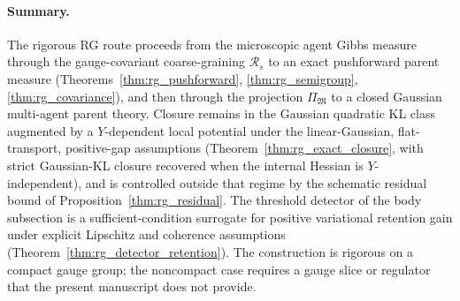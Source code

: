 \documentclass[11pt]{article}
\begin{document}
\paragraph{Summary.}
The rigorous RG route proceeds from the microscopic agent Gibbs measure through the gauge-covariant coarse-graining $\mathcal{R}_s$ to an exact pushforward parent measure (Theorems~\ref{thm:rg_pushforward}, \ref{thm:rg_semigroup}, \ref{thm:rg_covariance}), and then through the projection $\Pi_\mathfrak{M}$ to a closed Gaussian multi-agent parent theory. Closure remains in the Gaussian quadratic KL class augmented by a $Y$-dependent local potential under the linear-Gaussian, flat-transport, positive-gap assumptions (Theorem~\ref{thm:rg_exact_closure}, with strict Gaussian-KL closure recovered when the internal Hessian is $Y$-independent), and is controlled outside that regime by the schematic residual bound of Proposition~\ref{thm:rg_residual}. The threshold detector of the body subsection is a sufficient-condition surrogate for positive variational retention gain under explicit Lipschitz and coherence assumptions (Theorem~\ref{thm:rg_detector_retention}). The construction is rigorous on a compact gauge group; the noncompact case requires a gauge slice or regulator that the present manuscript does not provide.



\end{document}
